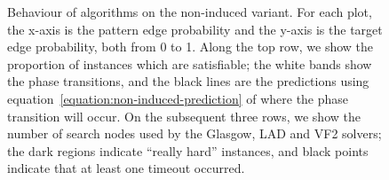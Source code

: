 \documentclass[twoside,11pt]{article}
\begin{document}
\begin{figure}[tb]

    \caption{Behaviour of algorithms on the non-induced variant. For each plot, the x-axis is the
        pattern edge probability and the y-axis is the target edge probability, both from 0 to 1.
        Along the top row, we show the proportion of instances which are satisfiable; the white
        bands show the phase transitions, and the black lines are the predictions using
        equation~\eqref{equation:non-induced-prediction} of where the
        phase transition will occur. On the subsequent three rows, we show the number of search nodes used by the
        Glasgow, LAD and VF2 solvers; the dark regions indicate ``really hard'' instances, and black
        points indicate that at least one timeout occurred.}
    \label{figure:non-induced}
\end{figure}
\end{document}
